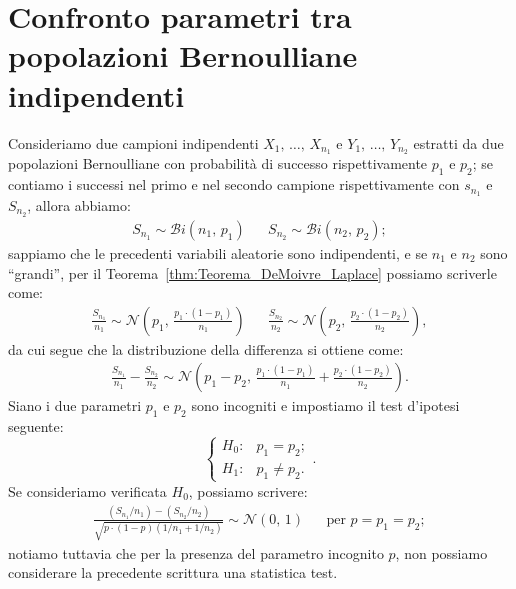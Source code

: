     \section{Confronto parametri tra popolazioni Bernoulliane indipendenti}
        \begin{defn}[Proporzione]
            Consideriamo due campioni indipendenti $X_1,\, \ldots,\, X_{n_1}$ e $Y_1,\, \ldots,\, Y_{n_2}$ 
            estratti da due popolazioni Bernoulliane con probabilità di successo rispettivamente $p_1$ e $p_2$; 
            se contiamo i successi nel primo e nel secondo campione rispettivamente con $s_{n_1}$ e $S_{n_2}$, 
            allora abbiamo:
            \begin{align*}
                S_{n_1} \sim \mathcal{B}i(n_1,\,p_1) & &
                S_{n_2} \sim \mathcal{B}i(n_2,\,p_2)
            ;\end{align*}
            sappiamo che le precedenti variabili aleatorie sono indipendenti, e se $n_1$ e $n_2$ sono 
            ``grandi'', per il Teorema~\ref{thm:Teorema_DeMoivre_Laplace} possiamo scriverle come:
            \begin{align*}
                \frac{S_{n_1}}{n_1} \sim \mathcal{N}\left(p_1,\, \frac{p_1\cdot(1-p_1)}{n_1}\right) & &
                \frac{S_{n_2}}{n_2} \sim \mathcal{N}\left(p_2,\, \frac{p_2\cdot(1-p_2)}{n_2}\right)
            ,\end{align*}
            da cui segue che la distribuzione della differenza si ottiene come:
            \begin{align*}
                \frac{S_{n_1}}{n_1} - \frac{S_{n_2}}{n_2} \sim \mathcal{N}\left(p_1-p_2,\, 
                \frac{p_1\cdot(1-p_1)}{n_1} + \frac{p_2\cdot(1-p_2)}{n_2}\right)
            .\end{align*}
            Siano i due parametri $p_1$ e $p_2$ sono incogniti e impostiamo il test d'ipotesi seguente: \[
                \begin{cases}
                    H_0 : & p_1 = p_2; \\
                    H_1 : & p_1 \neq p_2.
                \end{cases}
            .\] Se consideriamo verificata $H_0$, possiamo scrivere:
            \begin{align*}
                \frac{(S_{n_1} /n_1) - (S_{n_2} /n_2)}{\sqrt{p\cdot(1-p)(1 /n_1 + 1 /n_2)}} \sim 
                \mathcal{N}(0,\,1)
                & & \text{per } p = p_1 = p_2
            ;\end{align*}
            notiamo tuttavia che per la presenza del parametro incognito $p$, non possiamo considerare la 
            precedente scrittura una statistica test.


\end{defn}
